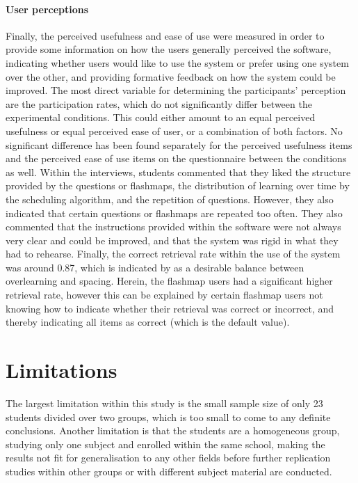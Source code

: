 \paragraph{User perceptions} Finally, the perceived usefulness and ease of use were measured in order to provide some information on how the users generally perceived the software, indicating whether users would like to use the system or prefer using one system over the other, and providing formative feedback on how the system could be improved. The most direct variable for determining the participants' perception are the participation rates, which do not significantly differ between the experimental conditions. This could either amount to an equal perceived usefulness or equal perceived ease of user, or a combination of both factors. No significant difference has been found separately for the perceived usefulness items and the perceived ease of use items on the questionnaire between the conditions as well. Within the interviews, students commented that they liked the structure provided by the questions or flashmaps, the distribution of learning over time by the scheduling algorithm, and the repetition of questions. However, they also indicated that certain questions or flashmaps are repeated too often. They also commented that the instructions provided within the software were not always very clear and could be improved, and that the system was rigid in what they had to rehearse. Finally, the correct retrieval rate within the use of the system was around 0.87, which is indicated by  as a desirable balance between overlearning and spacing. Herein, the flashmap users had a significant higher retrieval rate, however this can be explained by certain flashmap users not knowing how to indicate whether their retrieval was correct or incorrect, and thereby indicating all items as correct (which is the default value). 

\section{Limitations}

The largest limitation within this study is the small sample size of only 23 students divided over two groups, which is too small to come to any definite conclusions. Another limitation is that the students are a homogeneous group, studying only one subject and enrolled within the same school, making the results not fit for generalisation to any other fields before further replication studies within other groups or with different subject material are conducted.

